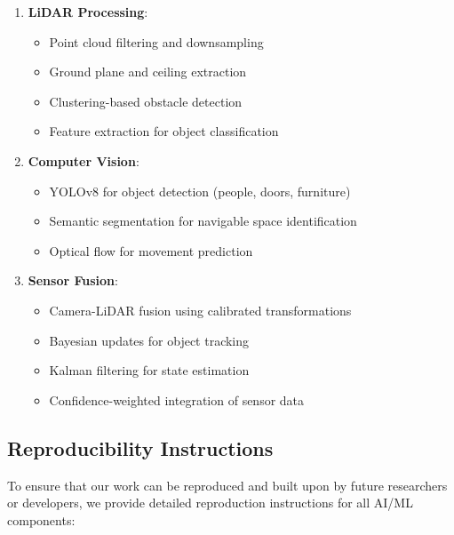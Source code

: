 \documentclass[12pt]{article}
\begin{document}
\begin{enumerate}
    \item \textbf{LiDAR Processing}:
    \begin{itemize}
        \item Point cloud filtering and downsampling
        \item Ground plane and ceiling extraction
        \item Clustering-based obstacle detection
        \item Feature extraction for object classification
    \end{itemize}
    
    \item \textbf{Computer Vision}:
    \begin{itemize}
        \item YOLOv8 for object detection (people, doors, furniture)
        \item Semantic segmentation for navigable space identification
        \item Optical flow for movement prediction
    \end{itemize}
    
    \item \textbf{Sensor Fusion}:
    \begin{itemize}
        \item Camera-LiDAR fusion using calibrated transformations
        \item Bayesian updates for object tracking
        \item Kalman filtering for state estimation
        \item Confidence-weighted integration of sensor data
    \end{itemize}
\end{enumerate}

\subsection{Reproducibility Instructions}

To ensure that our work can be reproduced and built upon by future researchers or developers, we provide detailed reproduction instructions for all AI/ML components:
\end{document}
